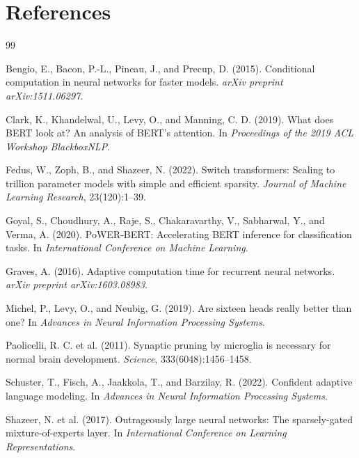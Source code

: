 \documentclass{article}
\begin{document}
\section*{References}

{\small
\begin{thebibliography}{99}

Bengio, E., Bacon, P.-L., Pineau, J., and Precup, D. (2015).
\newblock Conditional computation in neural networks for faster models.
\newblock \emph{arXiv preprint arXiv:1511.06297}.

Clark, K., Khandelwal, U., Levy, O., and Manning, C. D. (2019).
\newblock What does BERT look at? An analysis of BERT's attention.
\newblock In \emph{Proceedings of the 2019 ACL Workshop BlackboxNLP}.

Fedus, W., Zoph, B., and Shazeer, N. (2022).
\newblock Switch transformers: Scaling to trillion parameter models with
simple and efficient sparsity.
\newblock \emph{Journal of Machine Learning Research}, 23(120):1--39.

Goyal, S., Choudhury, A., Raje, S., Chakaravarthy, V., Sabharwal, Y., and
Verma, A. (2020).
\newblock PoWER-BERT: Accelerating BERT inference for classification tasks.
\newblock In \emph{International Conference on Machine Learning}.

Graves, A. (2016).
\newblock Adaptive computation time for recurrent neural networks.
\newblock \emph{arXiv preprint arXiv:1603.08983}.

Michel, P., Levy, O., and Neubig, G. (2019).
\newblock Are sixteen heads really better than one?
\newblock In \emph{Advances in Neural Information Processing Systems}.

Paolicelli, R. C. et al. (2011).
\newblock Synaptic pruning by microglia is necessary for normal brain
development.
\newblock \emph{Science}, 333(6048):1456--1458.

Schuster, T., Fisch, A., Jaakkola, T., and Barzilay, R. (2022).
\newblock Confident adaptive language modeling.
\newblock In \emph{Advances in Neural Information Processing Systems}.

Shazeer, N. et al. (2017).
\newblock Outrageously large neural networks: The sparsely-gated
mixture-of-experts layer.
\newblock In \emph{International Conference on Learning Representations}.


\end{thebibliography}}
\end{document}
